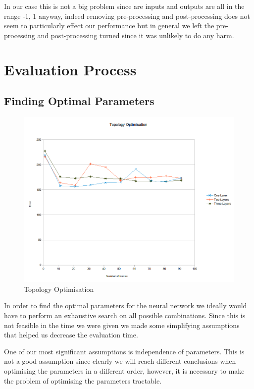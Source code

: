 \documentclass[10pt,a4paper]{article}
\begin{document}
In our case this is not a big problem since are inputs and outputs are all in the range -1, 1 anyway, indeed removing pre-processing and post-processing does not seem to particularly effect our performance but in general we left the pre-processing and post-processing turned since it was unlikely to do any harm. 

\section{Evaluation Process}

\subsection{Finding Optimal Parameters}

\begin{figure}[!ht]
     \centering
     \includegraphics[scale=0.6]{images/topology_graph.png}
     \caption{Topology Optimisation}
     \label{fig:topologyGraph}
\end{figure}

In order to find the optimal parameters for the neural network we ideally would have to perform an exhaustive search on all possible combinations. Since this is not feasible in the time we were given we made some simplifying assumptions that helped us decrease the evaluation time.

One of our most significant assumptions is independence of parameters. This is not a good assumption since clearly we will reach different conclusions when optimising the parameters in a different order, however, it is necessary to make the problem of optimising the parameters tractable.
\end{document}
